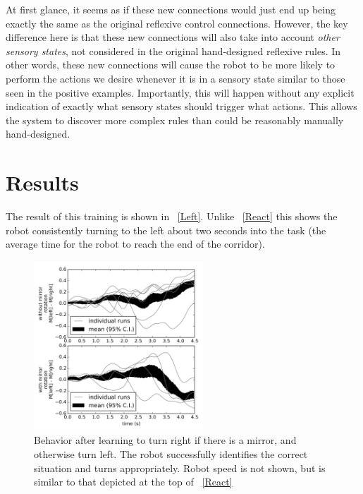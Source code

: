 \documentclass[conference]{IEEEtran}
\begin{document}
At first glance, it seems as if these new connections would just end up being 
exactly the same as the original reflexive control connections. However, the 
key difference here is that these new connections will also take into 
account \textit{other sensory states}, not considered in the original 
hand-designed reflexive rules. In other words, these new connections will 
cause the robot to be more likely to perform the actions we desire whenever it is in a sensory state similar to those seen in the positive examples. 
Importantly, this will happen without any explicit indication of exactly what 
sensory states should trigger what actions.  This allows the system to
discover more complex rules than could be reasonably manually hand-designed.

\section{Results}

The result of this training is shown in \figurename~\ref{Left}. Unlike 
\figurename~\ref{React} this shows the robot consistently turning to the left about 
two seconds into the task (the average time for the robot to reach the end of the corridor).


\begin{figure}[!t]
\centering
\includegraphics[width=2.5in]{learn-mirror/learnmirror.png}
\caption{Behavior after learning to turn right if there is a mirror, and otherwise turn left. The robot successfully identifies the correct situation and turns appropriately. Robot speed is not shown, but is similar to that depicted at the top of \figurename~\ref{React}}
\label{Right}
\end{figure}
\end{document}
